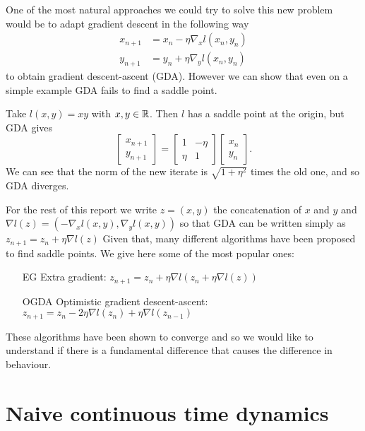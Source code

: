 \documentclass[main.tex]{subfiles}
\begin{document}
One of the most natural approaches we could try to solve this new problem would
be to adapt gradient descent in the following way
\begin{align*}
    x_{n+1} & = x_n - \eta \nabla_x l(x_n, y_n) \\
    y_{n + 1} & = y_n + \eta \nabla_y l(x_n, y_n)
\end{align*}
to obtain gradient descent-ascent (GDA). However we can show that even on a
simple example GDA fails to find a saddle point.
\begin{ex}
    Take $l(x,y) = xy$ with $x, y \in \mathbb{R}$. Then $l$ has a saddle point at the origin, but GDA gives
    \[
        \begin{bmatrix}
            x_{n+1} \\
            y_{n+1}
        \end{bmatrix}
        = \begin{bmatrix}
            1 & -\eta \\
            \eta & 1
        \end{bmatrix}
        \begin{bmatrix}
            x_n \\
            y_n
        \end{bmatrix}.
    \]
    We can see that the norm of the new iterate is $\sqrt{1 + \eta^2}$ times
    the old one, and so GDA diverges.
\end{ex}
For the rest of this report we write $z = (x,y)$ the concatenation of $x$ and
$y$ and $\nabla l(z) = (-\nabla_x l(x,y), \nabla_y l(x,y))$ so that GDA can be
written simply as $z_{n+1} = z_n + \eta \nabla l(z)$
Given that, many different algorithms have been proposed to find saddle points.
We give here some of the most popular ones: 
\begin{itemize}
    \item[EG] Extra gradient: $z_{n+1} = z_n + \eta \nabla l(z_n + \eta \nabla l(z))$ 
    \item[OGDA] Optimistic gradient descent-ascent: $z_{n+1} = z_n - 2\eta \nabla l(z_n) + \eta \nabla l(z_{n-1})$
\end{itemize}
These algorithms have been shown to converge  and so we would like to understand if there is a fundamental difference
that causes the difference in behaviour.

\section{Naive continuous time dynamics}
\end{document}
